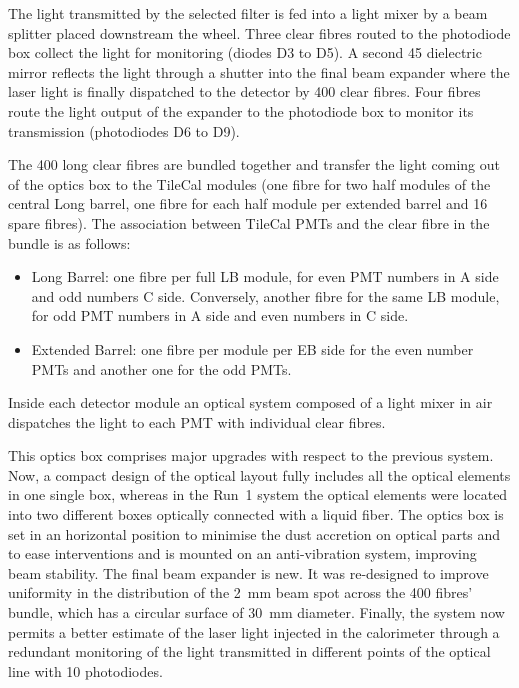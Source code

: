 The light transmitted by the selected filter is fed into a light mixer by a beam splitter placed downstream the wheel. Three clear fibres routed to the photodiode box collect the light for monitoring (diodes D3 to D5). A second 45\textdegree{} dielectric mirror reflects the light through a shutter into the final beam expander where the laser light is finally dispatched to the detector by 400 clear fibres. Four fibres route the light output of the expander to the photodiode box to monitor its transmission (photodiodes D6 to D9). 

The 400 long clear fibres are bundled together and transfer the light coming out of the optics box to the TileCal modules (one fibre for two half modules of the central Long barrel, one fibre for each half module per extended barrel and 16 spare fibres). The association between TileCal PMTs and the clear fibre in the bundle is as follows:
\begin{itemize}
\item Long Barrel: one fibre per full LB module, for even PMT numbers in A side and odd numbers C side. Conversely, another fibre for the same LB module, for odd PMT numbers in A side and even numbers in C side.
\item Extended Barrel: one fibre per module per EB side for the even number PMTs and another one for the odd PMTs.
\end{itemize}
Inside each detector module an optical system composed of a light mixer in air dispatches the light to each PMT with individual clear fibres.

This optics box comprises major upgrades with respect to the previous system. Now, a compact design of the optical layout fully includes all the optical elements in one single box, whereas in the Run~1 system the optical elements were located into two different boxes optically connected with a liquid fiber. The optics box is set in an horizontal position to minimise the dust accretion on optical parts and to ease interventions and is mounted on an anti-vibration system, improving beam stability. The final beam expander is new. It was re-designed to improve uniformity in the distribution of the 2~mm beam spot across the 400 fibres' bundle, which has a circular surface of 30~mm diameter. Finally, the system now permits a better estimate of the laser light injected in the calorimeter through a redundant monitoring of the light transmitted in different points of the optical line with 10 photodiodes.

